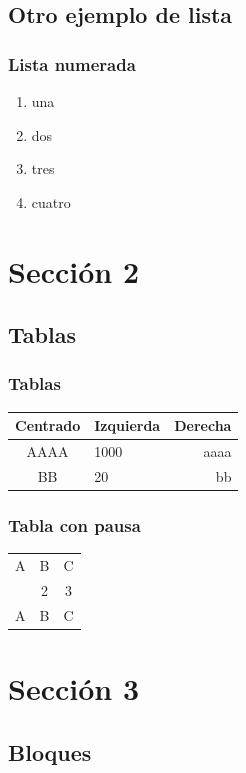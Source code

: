 \documentclass{beamer}
\begin{document}
\subsection{Otro ejemplo de lista}
\begin{frame}
    \frametitle{Lista numerada}
    \begin{enumerate}
        \item una
        \item dos
        \item tres
        \item cuatro
    \end{enumerate}
\end{frame}

\section{Sección 2}
\subsection{Tablas}

\begin{frame}
    \frametitle{Tablas}
    \begin{tabular}{|c|l|r|} \hline
        \textbf{Centrado} & \textbf{Izquierda} & \textbf{Derecha} \\ \hline
        AAAA              & 1000               & aaaa             \\ \hline
        BB                & 20                 & bb               \\ \hline
    \end{tabular}
\end{frame}

\begin{frame}
    \frametitle{Tabla con pausa}
    \begin{tabular}{c c c}
        A & B & C \\ \pause
        1 & 2 & 3 \\  \pause
        A & B & C \\
    \end{tabular}
\end{frame}

\section{Sección 3}
\subsection{Bloques}
\end{document}
